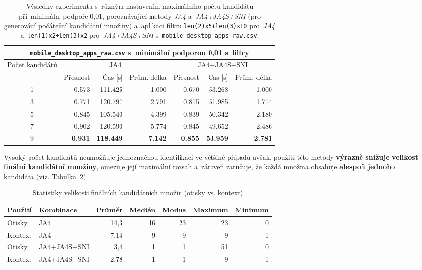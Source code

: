 \begin{table}[H]
	\centering
	\begin{tabular}{c|rrr|rrr}
		\toprule
		\multicolumn{7}{c}{\texttt{mobile\_desktop\_apps\_raw.csv} s~minimální podporou 0{,}01 s~filtry}  \\
		\midrule
		\multirow{2}{*}{Počet kandidátů} & \multicolumn{3}{c}{JA4} & \multicolumn{3}{c}{JA4+JA4S+SNI}\\
		  & Přesnost      & Čas [s]         & Prům. délka  & Přesnost      & Čas [s]        & Prům. délka  \\
		\midrule
		1 & 0.573          & 111.425          & 1.000          & 0.670          & 53.268          & 1.000          \\
		3 & 0.771          & 120.797          & 2.791          & 0.815          & 51.985          & 1.714          \\
		5 & 0.845          & 105.540          & 4.399          & 0.839          & 50.342          & 2.180          \\
		7 & 0.902          & 120.590          & 5.774          & 0.845          & 49.652          & 2.486          \\
		9 & \textbf{0.931} & \textbf{118.449} & \textbf{7.142} & \textbf{0.855} & \textbf{53.959} & \textbf{2.781} \\
		\bottomrule
	\end{tabular}
	\caption{Výsledky experimentu s~různým nastavením maximálního počtu kandidátů při~minimální podpoře 0{,}01, porovnávající metody \textit{JA4} a~\textit{JA4+JA4S+SNI} (pro generování počáteční kandidátní množiny) a~aplikaci filtru \texttt{len(2)x5+len(3)x10} pro~\textit{JA4} a~\texttt{len(1)x2+len(3)x2} pro~\textit{JA4+JA4S+SNI} s~\texttt{mobile desktop apps raw.csv}.}
	\label{tab:mobile-filters}
\end{table}

Vysoký počet kandidátů neumožňuje jednoznačnou identifikaci ve většině případů avšak, použití této metody \textbf{výrazně snižuje velikost finální kandidátní množiny}, omezuje její maximální rozsah a~zároveň zaručuje, že každá množina obsahuje \textbf{alespoň jednoho} kandidáta (viz. Tabulka~\ref{tab:cand-set-stats}).

\begin{table}[H]
	\centering
	\begin{tabular}{llrrrrr}
		\toprule
		Použití        & Kombinace       & Průměr & Medián & Modus & Maximum & Minimum \\
		\midrule
			
		Otisky  & JA4          & 14{,}3   & 16      & 23    & 23      & 0       \\
		Kontext & JA4          & 7{,}14   & 9       & 9     & 9       & 1       \\
		Otisky  & JA4+JA4S+SNI & 3{,}4    & 1       & 1     & 51      & 0       \\
			  
		Kontext & JA4+JA4S+SNI & 2{,}78   & 1       & 1     & 9       & 1       \\
		\bottomrule
	\end{tabular}
	\caption{Statistiky velikosti finálních kandidátních množin (otisky vs. kontext)}
	\label{tab:cand-set-stats}
\end{table}


